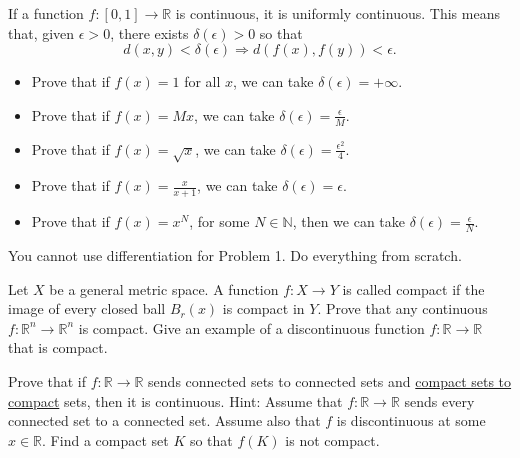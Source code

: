   \begin{exercise}
    If a function $f : [0, 1] \to \mathbb{R}$ is continuous, it is uniformly continuous. This means that, given $\epsilon > 0$, there exists $\delta(\epsilon) > 0$ so that
    \begin{equation}
      d(x, y) < \delta(\epsilon) \Rightarrow d(f(x), f(y)) < \epsilon.
    \end{equation}
    \begin{itemize}
      \item Prove that if $f(x) = 1$ for all $x$, we can take $\delta(\epsilon) = +\infty$.
      \item Prove that if $f(x) = Mx$, we can take $\delta(\epsilon) = \frac{\epsilon}{M}$.
      \item Prove that if $f(x) = \sqrt{x}$, we can take $\delta(\epsilon) = \frac{\epsilon^2}{4}$.
      \item Prove that if $f(x) = \frac{x}{x+1}$, we can take $\delta(\epsilon) = \epsilon$.
      \item Prove that if $f(x) = x^N$, for some $N \in \mathbb{N}$, then we can take $\delta(\epsilon) = \frac{\epsilon}{N}$.
    \end{itemize}
    You cannot use differentiation for Problem 1. Do everything from scratch.
  \end{exercise}
  \begin{solution}

  \end{solution}

  \begin{exercise}
    Let $X$ be a general metric space. A function $f : X \to Y$ is called compact if the image of every closed ball $B_r(x)$ is compact in $Y$. Prove that any continuous $f : \mathbb{R}^n \to \mathbb{R}^n$ is compact. Give an example of a discontinuous function $f : \mathbb{R} \to \mathbb{R}$ that is compact.
  \end{exercise}
  \begin{solution}

  \end{solution}

  \begin{exercise}
    Prove that if $f : \mathbb{R} \to \mathbb{R}$ sends connected sets to connected sets and \hyperref[thm:compact-sets-to-compact]{compact sets to compact} sets, then it is continuous. Hint: Assume that $f : \mathbb{R} \to \mathbb{R}$ sends every connected set to a connected set. Assume also that $f$ is discontinuous at some $x \in \mathbb{R}$. Find a compact set $K$ so that $f(K)$ is not compact.
  \end{exercise}
  \begin{solution}

  \end{solution}


